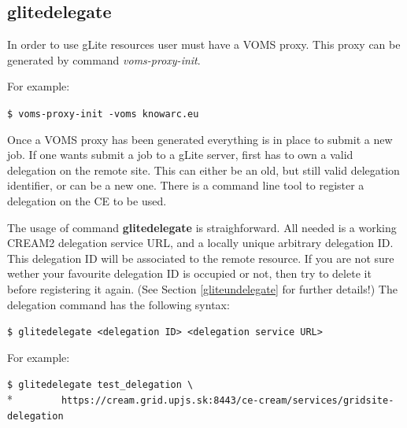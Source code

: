 \documentclass{article}
\begin{document}
\subsection{glitedelegate}
\label{glitedelegate}
In order to use gLite resources user must have a VOMS proxy. This proxy can be generated by command \textit{voms-proxy-init}.\par
For example:
\begin{shaded}\verb#$ voms-proxy-init -voms knowarc.eu#\end{shaded}
Once a VOMS proxy has been generated everything is in place to submit a new job. If one wants submit a job to a gLite server, first has to own a valid delegation on the remote site. This can either be an old, but still valid delegation identifier, or can be a new one. There is a command line tool to register a delegation on the CE to be used.\par
The usage of command \textbf{glitedelegate} is straighforward. All needed is a working CREAM2 delegation service URL, and a locally unique arbitrary delegation ID. This delegation ID will be associated to the remote resource. If you are not sure wether your favourite delegation ID is occupied or not, then try to delete it before registering it again. (See Section \ref{gliteundelegate} for further details!) The delegation command has the following syntax:
\begin{shaded}\verb#$ glitedelegate <delegation ID> <delegation service URL>#\end{shaded}
For example:
\begin{shaded}\verb#$ glitedelegate test_delegation \#\\*
\verb#        https://cream.grid.upjs.sk:8443/ce-cream/services/gridsite-delegation#\end{shaded}
\end{document}
